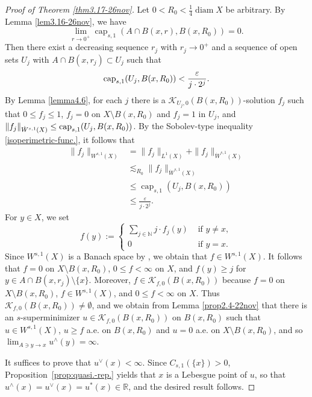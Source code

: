 \documentclass[11pt,leqno]{amsart}
\numberwithin{equation}{section}
\theoremstyle{definition}
\DeclareMathOperator{\capp}{cap}
\newcommand{\caps}{\capp_{s,1}}
\DeclareMathOperator{\diam}{diam}
\begin{document}
	\begin{proof}[Proof of Theorem \ref{thm3.17-26nov}]
		Let $0<R_0<\frac{1}{4}\diam X$ be arbitrary.
		By Lemma \ref{lem3.16-26nov}, we have 
		$$\lim_{r\to0^+}\caps(A\cap B(x,r), B(x, R_0))=0.$$
		Then there exist a decreasing sequence $r_j$ with $r_j\to0^+$ and a sequence of open sets $U_j$  with $A\cap B(x,r_j)\subset U_j$
		such that 
		\begin{equation}\notag
			{\rm cap}_{s,1}(U_j, B(x,R_0))< \frac{\varepsilon}{j\cdot 2^j}.
		\end{equation}
		By Lemma \ref{lemma4.6}, for each $j$ there is 
		a $\mathcal K_{U_j,0}(B(x,R_0))$-solution  $f_j$ such that $0\leq f_j\leq 1$,
		$f_j=0$ on $X\setminus B(x,R_0)$ and  $f_j=1$ in $U_j$,
		and $\|f_j\|_{\dot W^{s,1}(X)}\leq {\rm cap}_{s,1}(U_j, B(x,R_0))$.
		By the Sobolev-type inequality \eqref{isoperimetric-func.}, it follows that 
		\begin{align*}
			\|f_j\|_{W^{s,1}(X)}
			&=\|f_j\|_{L^1(X)}+\|f_j\|_{\dot W^{s,1}(X)}\\
			&\lesssim_{R_0} \|f_j\|_{\dot W^{s,1}(X)}\\
			&\leq  \caps(U_j, B(x,R_0))\\
			&\leq \frac{\varepsilon}{j\cdot 2^j}.  
		\end{align*}
		{For $y\in X$, we set
			\[
			f(y):= \begin{cases}
				\sum_{j\in\mathbb N} j\cdot f_j(y) &\text{\ if $y\neq x$},\\
				0	&\text{\ if $y= x$}.
			\end{cases}
			\]
			Since $W^{s,1}(X)$ is a Banach space by \cite[Remark 9.8]{BBS22}, we obtain that  $f\in W^{s,1}(X)$.
		}
		It follows that $f=0$ on $X\setminus B(x,R_0)$, {  $0\leq f<\infty$ on $X$, and  $f(y)\geq j$ for $y\in A\cap B(x,r_j)\setminus \{x\}$.}
		Moreover, $f\in \mathcal K_{f,0}(B(x,R_0))$ because $f=0$ on $X\setminus B(x,R_0)$, $f\in W^{s,1}(X)$, {and $0\leq f<\infty$ on $X$}. Thus $\mathcal K_{f,0}(B(x,R_0))\neq\emptyset$, and we obtain from
		Lemma \ref{prop2.4-22nov}
		that there is an $s$-superminimizer $u\in\mathcal K_{f,0}(B(x,R_0))$ on $B(x,R_0)$  such that $u\in W^{s,1}(X)$, $u\geq f$ a.e. on $B(x,R_0)$ and $u=0$ a.e. on $X\setminus B(x,R_0)$, and so
		$
		\lim_{A\ni y\to x}u^\wedge (y)=\infty.
		$
		
		It suffices to prove that $u^\vee(x)<\infty$.
		Since $C_{s,1}(\{x\})>0$, Proposition~\ref{prop:quasi.-rep.} yields that $x$ is a Lebesgue point of $u$, so that $u^\wedge(x)=u^\vee(x)=u^*(x)\in\mathbb R$, and the desired result follows.
	\end{proof}
	
\end{document}
